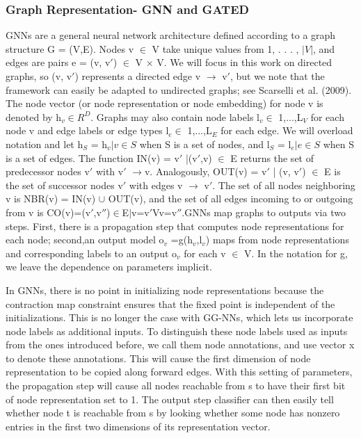\documentclass{article}
\begin{document}
\subsubsection{Graph Representation- GNN and GATED}
GNNs are a general neural network architecture defined according to a graph structure G = (V,E). Nodes v $\in$ V take unique values from 1, . . . , $|V|$, and edges are pairs e = (v, v$'$) $\in$ V × V. We will focus in this work on directed graphs, so (v, v$'$) represents a directed edge v $\rightarrow$ v$'$, but we note that the framework can easily be adapted to undirected graphs; see Scarselli et al. (2009). The node vector (or node representation or node embedding) for node v is denoted by h$_v \in R^D$. Graphs may also contain node labels l$_v \in$ {1,...,L$_V$} for each node v and edge labels or edge types l$_e \in$ {1,...,L$_E$} for each edge. We will overload notation and let h$_S$ = {h$_v | v \in S$} when S is a set of nodes, and l$_S$ = {l$_e | e \in S$} when S is a set of edges. The function IN(v) = {v$'$ |(v$'$,v) $\in$ E} returns the set of predecessor nodes v$'$ with v$'$ $\rightarrow$v. Analogously, OUT(v) = {v$'$ | (v, v$'$) $\in$ E} is the set of successor nodes v$'$ with edges v $\rightarrow$ v$'$. The set of all nodes neighboring v is NBR(v) = IN(v) $\cup$ OUT(v), and the set of all edges incoming to or outgoing from v is CO(v)={(v$'$,v$''$)$\in$E$|$v=v$'$Vv=v$''$}.GNNs map graphs to outputs via two steps. First, there is a propagation step that computes node representations for each node; second,an output model o$_v$ =g(h$_v$,l$_v$) maps from node representations and corresponding labels to an output o$_v$ for each v $\in$ V. In the notation for g, we leave the dependence on parameters implicit.

In GNNs, there is no point in initializing node representations because the contraction map constraint ensures that the fixed point is independent of the initializations. This is no longer the case with GG-NNs, which lets us incorporate node labels as additional inputs. To distinguish these node labels used as inputs from the ones introduced before, we call them node annotations, and use vector x to denote these annotations. This will cause the first dimension of node representation to be copied along forward edges. With this setting of parameters, the propagation step will cause all nodes reachable from s to have their first bit of node representation set to 1. The output step classifier can then easily tell whether node t is reachable from s by looking whether some node has nonzero entries in the first two dimensions of its representation vector.
\end{document}
